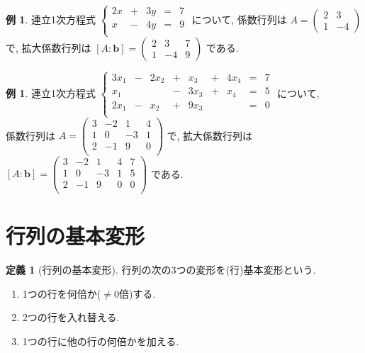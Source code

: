 \documentclass[dvipdfmx,a4paper,11pt]{article}
\theoremstyle{definition}
\newtheorem{dfn}[thm]{定義}
\newtheorem{exa}[thm]{例}
\begin{document}
 \begin{exa}
 連立1次方程式
 $
 \left\{ 
\begin{matrix}
2x&+&3y& = &7 \\
x&-&4y& = &9 \\
\end{matrix}
\right.
 $
 について, 係数行列は
 $A = 
 \begin{pmatrix}
 2 & 3 \\
 1 & -4
 \end{pmatrix}
 $
 で, 拡大係数行列は
 $[A : \bm{b}] = 
  \begin{pmatrix}
 2 & 3  &7\\
 1 & -4 &9
 \end{pmatrix}
 $
 である.
 \end{exa}
 
  \begin{exa}
 連立1次方程式
 $
 \left\{ 
\begin{matrix}
3x_1&-&2x_2& +& x_3 &+& 4x_4 &=& 7 \\
x_1 &  & 	   & -& 3x_3 &+& x_4 &=& 5 \\
2x_1&-& x_2& +& 9x_3 & & 	 &=& 0 \\
\end{matrix}
\right.
 $
 について, \\
 係数行列は
 $A = 
 \begin{pmatrix}
 3 & -2  & 1&4\\
 1 & 0   & -3&1\\
2 & -1  & 9&0\\
 \end{pmatrix}
 $
 で, 拡大係数行列は
 $[A : \bm{b}] = 
 \begin{pmatrix}
 3 & -2  & 1&4 & 7\\
 1 & 0   & -3&1 &5\\
2 & -1  & 9&0 & 0\\
 \end{pmatrix}
 $
 である.
 \end{exa}
 
 \section{行列の基本変形}
  \begin{tcolorbox}[
    colback = white,
    colframe = green!35!black,
    fonttitle = \bfseries,
    breakable = true]
    \begin{dfn}[行列の基本変形]
 行列の次の3つの変形を(行)基本変形という.
 \begin{enumerate}
 \item 1つの行を何倍か($\neq 0$倍)する.
 \item 2つの行を入れ替える.
 \item1つの行に他の行の何倍かを加える.
 \end{enumerate}
  \end{dfn}
  
 \end{tcolorbox} 
\end{document}
